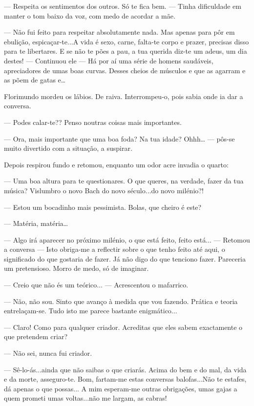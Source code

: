 --- Respeita os sentimentos dos outros. Só te fica bem. ---  Tinha
dificuldade em manter o tom baixo da voz, com medo de acordar a mãe.

--- Não fui feito para respeitar absolutamente nada. Mas apenas para pôr
em ebulição, espicaçar-te...A vida é sexo, carne, falta-te corpo e
prazer, precisas disso para te libertares. E se não te pões a pau, a tua
querida diz-te um adeus, um dia destes! --- Continuou ele --- Há por aí uma
série de homens saudáveis, apreciadores de umas boas curvas. Desses
cheios de músculos e que as agarram e as põem de gatas e\ldots{}

Florimundo mordeu os lábios. De raiva. Interrompeu-o, pois sabia onde ia
dar a conversa.

--- Podes calar-te?? Penso noutras coisas mais importantes.

--- Ora, mais importante que uma boa foda? Na tua idade? Ohhh\ldots{} --- 
pôs-se muito divertido com a situação, a suspirar.

Depois respirou fundo e retomou, enquanto um odor acre invadia o quarto:

--- Uma boa altura para te questionares. O que queres, na verdade, fazer
da tua música? Vislumbro o novo Bach do novo século...do novo milénio?!

--- Estou um bocadinho mais pessimista. Bolas, que cheiro é este?

--- Matéria, matéria\ldots{}

--- Algo irá aparecer no próximo milénio, o que está feito, feito está...
---  Retomou a conversa --- Isto obriga-me a reflectir sobre o que tenho
feito até aqui, o significado do que gostaria de fazer. Já não digo do
que tenciono fazer. Pareceria um pretensioso. Morro de medo, só de
imaginar.

--- Creio que não és um teórico... --- Acrescentou o mafarrico.

--- Não, não sou. Sinto que avanço à medida que vou fazendo. Prática e
teoria entrelaçam-se. Tudo isto me parece bastante enigmático...

--- Claro! Como para qualquer criador. Acreditas que eles sabem
exactamente o que pretendem criar?

--- Não sei, nunca fui criador.

--- Sê-lo-ás...ainda que não saibas o que criarás. Acima do bem e do mal,
da vida e da morte, asseguro-te. Bom, fartam-me estas conversas
balofas...Não te estafes, dá apenas o que possas... A mim esperam-me
outras obrigações, umas gajas a quem prometi umas voltas...não me
largam, as cabras!


